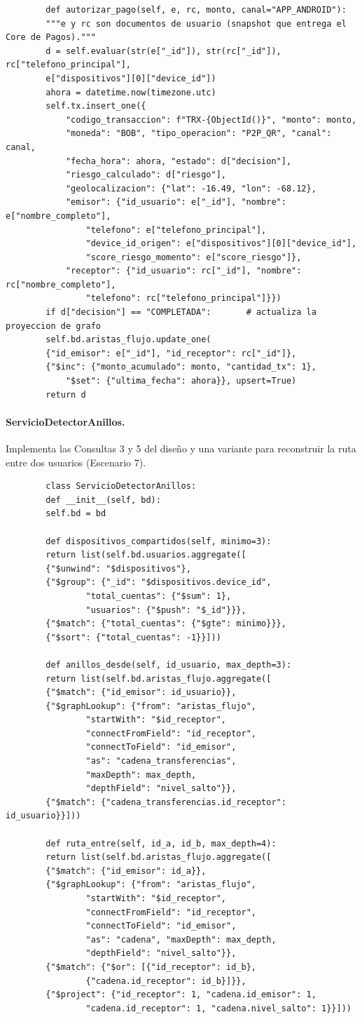 \documentclass[11pt,a4paper]{article}
\begin{document}
\begin{lstlisting}
		def autorizar_pago(self, e, rc, monto, canal="APP_ANDROID"):
		"""e y rc son documentos de usuario (snapshot que entrega el Core de Pagos)."""
		d = self.evaluar(str(e["_id"]), str(rc["_id"]), rc["telefono_principal"],
		e["dispositivos"][0]["device_id"])
		ahora = datetime.now(timezone.utc)
		self.tx.insert_one({
			"codigo_transaccion": f"TRX-{ObjectId()}", "monto": monto,
			"moneda": "BOB", "tipo_operacion": "P2P_QR", "canal": canal,
			"fecha_hora": ahora, "estado": d["decision"],
			"riesgo_calculado": d["riesgo"],
			"geolocalizacion": {"lat": -16.49, "lon": -68.12},
			"emisor": {"id_usuario": e["_id"], "nombre": e["nombre_completo"],
				"telefono": e["telefono_principal"],
				"device_id_origen": e["dispositivos"][0]["device_id"],
				"score_riesgo_momento": e["score_riesgo"]},
			"receptor": {"id_usuario": rc["_id"], "nombre": rc["nombre_completo"],
				"telefono": rc["telefono_principal"]}})
		if d["decision"] == "COMPLETADA":       # actualiza la proyeccion de grafo
		self.bd.aristas_flujo.update_one(
		{"id_emisor": e["_id"], "id_receptor": rc["_id"]},
		{"$inc": {"monto_acumulado": monto, "cantidad_tx": 1},
			"$set": {"ultima_fecha": ahora}}, upsert=True)
		return d
	\end{lstlisting}
	
	\paragraph{ServicioDetectorAnillos.} Implementa las Consultas 3 y 5 del diseño y una variante para reconstruir la ruta entre dos usuarios (Escenario 7).
	\begin{lstlisting}
		class ServicioDetectorAnillos:
		def __init__(self, bd):
		self.bd = bd
		
		def dispositivos_compartidos(self, minimo=3):
		return list(self.bd.usuarios.aggregate([
		{"$unwind": "$dispositivos"},
		{"$group": {"_id": "$dispositivos.device_id",
				"total_cuentas": {"$sum": 1},
				"usuarios": {"$push": "$_id"}}},
		{"$match": {"total_cuentas": {"$gte": minimo}}},
		{"$sort": {"total_cuentas": -1}}]))
		
		def anillos_desde(self, id_usuario, max_depth=3):
		return list(self.bd.aristas_flujo.aggregate([
		{"$match": {"id_emisor": id_usuario}},
		{"$graphLookup": {"from": "aristas_flujo",
				"startWith": "$id_receptor",
				"connectFromField": "id_receptor",
				"connectToField": "id_emisor",
				"as": "cadena_transferencias",
				"maxDepth": max_depth,
				"depthField": "nivel_salto"}},
		{"$match": {"cadena_transferencias.id_receptor": id_usuario}}]))
		
		def ruta_entre(self, id_a, id_b, max_depth=4):
		return list(self.bd.aristas_flujo.aggregate([
		{"$match": {"id_emisor": id_a}},
		{"$graphLookup": {"from": "aristas_flujo",
				"startWith": "$id_receptor",
				"connectFromField": "id_receptor",
				"connectToField": "id_emisor",
				"as": "cadena", "maxDepth": max_depth,
				"depthField": "nivel_salto"}},
		{"$match": {"$or": [{"id_receptor": id_b},
				{"cadena.id_receptor": id_b}]}},
		{"$project": {"id_receptor": 1, "cadena.id_emisor": 1,
				"cadena.id_receptor": 1, "cadena.nivel_salto": 1}}]))
	\end{lstlisting}
	
\end{document}
